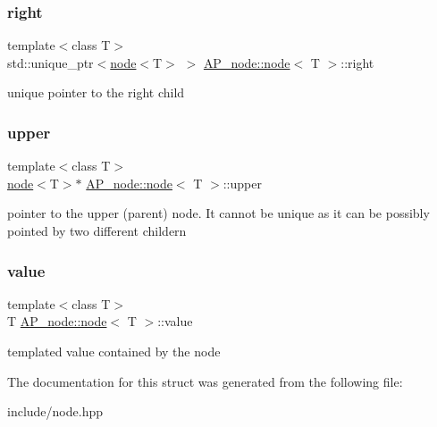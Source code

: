 \subsubsection{\texorpdfstring{right}{right}}
{\footnotesize\ttfamily template$<$class T$>$ \\
std\+::unique\+\_\+ptr$<$\hyperlink{structAP__node_1_1node}{node}$<$T$>$ $>$ \hyperlink{structAP__node_1_1node}{A\+P\+\_\+node\+::node}$<$ T $>$\+::right}

unique pointer to the right child \mbox{\label{structAP__node_1_1node_acadd81185b4232098b48eb317e105007}} 
\subsubsection{\texorpdfstring{upper}{upper}}
{\footnotesize\ttfamily template$<$class T$>$ \\
\hyperlink{structAP__node_1_1node}{node}$<$T$>$$\ast$ \hyperlink{structAP__node_1_1node}{A\+P\+\_\+node\+::node}$<$ T $>$\+::upper}

pointer to the upper (parent) node. It cannot be unique as it can be possibly pointed by two different childern \mbox{\label{structAP__node_1_1node_abbde5206a54167ba046551879f409134}} 
\subsubsection{\texorpdfstring{value}{value}}
{\footnotesize\ttfamily template$<$class T$>$ \\
T \hyperlink{structAP__node_1_1node}{A\+P\+\_\+node\+::node}$<$ T $>$\+::value}

templated value contained by the node 

The documentation for this struct was generated from the following file\+:\begin{DoxyCompactItemize}
\item 
include/node.\+hpp\end{DoxyCompactItemize}
